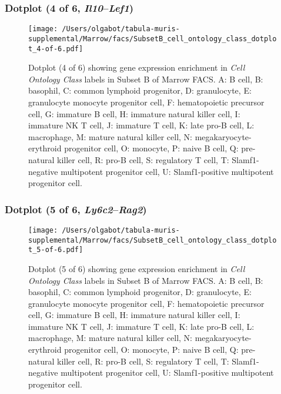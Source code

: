 \subsubsection{Dotplot (4 of 6, \emph{Il10}--\emph{Lef1})}
\begin{figure}[h]
\centering
\texttt{[image: /Users/olgabot/tabula-muris-supplemental/Marrow/facs/SubsetB\_cell\_ontology\_class\_dotplot\_4-of-6.pdf]}

\caption{ Dotplot (4 of 6)  showing gene expression enrichment in \emph{Cell Ontology Class} labels in Subset B of Marrow FACS. A: B cell, B: basophil, C: common lymphoid progenitor, D: granulocyte, E: granulocyte monocyte progenitor cell, F: hematopoietic precursor cell, G: immature B cell, H: immature natural killer cell, I: immature NK T cell, J: immature T cell, K: late pro-B cell, L: macrophage, M: mature natural killer cell, N: megakaryocyte-erythroid progenitor cell, O: monocyte, P: naive B cell, Q: pre-natural killer cell, R: pro-B cell, S: regulatory T cell, T: Slamf1-negative multipotent progenitor cell, U: Slamf1-positive multipotent progenitor cell.}
\end{figure}


\clearpage

\subsubsection{Dotplot (5 of 6, \emph{Ly6c2}--\emph{Rag2})}
\begin{figure}[h]
\centering
\texttt{[image: /Users/olgabot/tabula-muris-supplemental/Marrow/facs/SubsetB\_cell\_ontology\_class\_dotplot\_5-of-6.pdf]}

\caption{ Dotplot (5 of 6)  showing gene expression enrichment in \emph{Cell Ontology Class} labels in Subset B of Marrow FACS. A: B cell, B: basophil, C: common lymphoid progenitor, D: granulocyte, E: granulocyte monocyte progenitor cell, F: hematopoietic precursor cell, G: immature B cell, H: immature natural killer cell, I: immature NK T cell, J: immature T cell, K: late pro-B cell, L: macrophage, M: mature natural killer cell, N: megakaryocyte-erythroid progenitor cell, O: monocyte, P: naive B cell, Q: pre-natural killer cell, R: pro-B cell, S: regulatory T cell, T: Slamf1-negative multipotent progenitor cell, U: Slamf1-positive multipotent progenitor cell.}
\end{figure}


\clearpage

